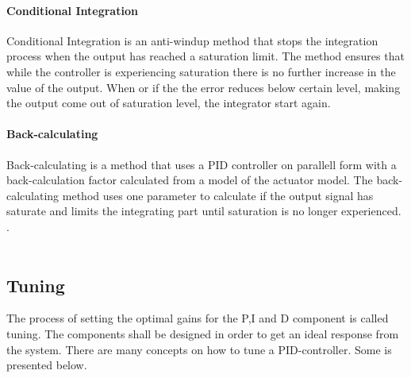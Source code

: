 \paragraph{Conditional Integration}
Conditional Integration is an anti-windup method that stops the integration process when the output has reached a saturation limit. The method ensures that while the controller is experiencing saturation there is no further increase in the value of the output. When or if the the error reduces below certain level, making the output come out of saturation level, the integrator start again. \cite{clamping}
\paragraph{Back-calculating}
Back-calculating is a method that uses a PID controller on parallell form with a back-calculation factor calculated from a model of the actuator model. The back-calculating method uses one parameter to calculate if the output signal has saturate and limits the integrating part until saturation is no longer experienced. \cite{clamping}. \\
\\
\subsection{Tuning}
The process of setting the optimal gains for the P,I and D component is called tuning. The components shall be designed in order to get an ideal response from the system. There are many concepts on how to tune a PID-controller. Some is presented below.\\
\\
